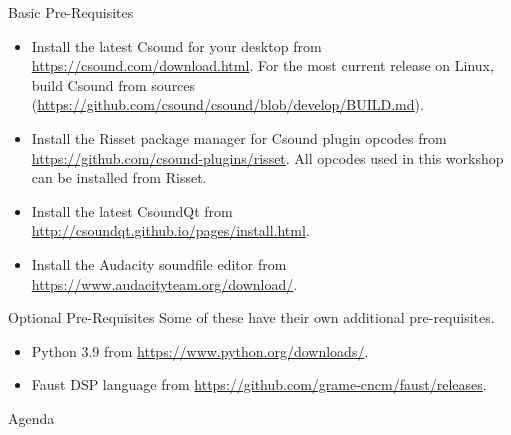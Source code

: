 \documentclass{beamer}
\begin{document}
    \begin{frame}{Basic Pre-Requisites}
        \begin{itemize}
            \item Install the latest Csound for your desktop from
            \url{https://csound.com/download.html}. For the most current release on
            Linux, build Csound from sources
            (\url{https://github.com/csound/csound/blob/develop/BUILD.md}).
            \item Install the Risset package manager for Csound plugin opcodes from 
            \url{https://github.com/csound-plugins/risset}. All opcodes used in this 
            workshop can be installed from Risset.
            \item Install the latest CsoundQt from
            \url{http://csoundqt.github.io/pages/install.html}.
            \item Install the Audacity soundfile editor from
            \url{https://www.audacityteam.org/download/}.
        \end{itemize}
    \end{frame}
    \begin{frame}{Optional Pre-Requisites}
        Some of these have their own additional pre-requisites.
        \begin{itemize}
            \item Python 3.9 from \url{https://www.python.org/downloads/}.
            \item Faust DSP language from
            \url{https://github.com/grame-cncm/faust/releases}.
        \end{itemize}
    \end{frame}
    
    \begin{frame}{Agenda}
        \tableofcontents
    \end{frame}
    
\end{document}
